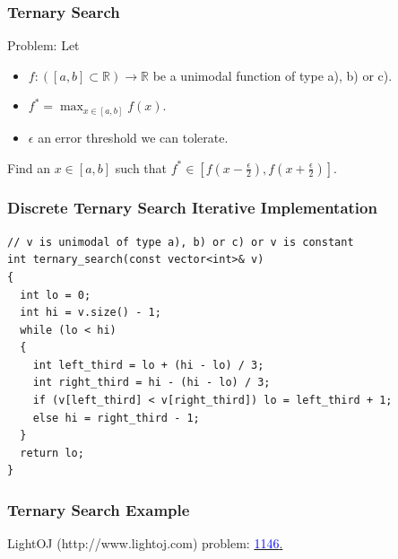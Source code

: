 \documentclass{beamer}
\newcommand{\lightojlink}[2]{LightOJ (http://www.lightoj.com)
  problem: \href{#2}{\textcolor{blue}{#1}.}}
\begin{document}
\begin{frame}%
\frametitle{Ternary Search}


\footnotesize

\begin{mdframed}[style=exampledefault]
Problem: Let
\begin{itemize}
\item $f: ([a,b] \subset \mathbb{R}) \rightarrow \mathbb{R}$ be a unimodal function of type a), b) or c).
\item $f^* = \max_{x \in [a,b]} f(x)$.
\item $\epsilon$ an error threshold we can tolerate.
\end{itemize}
Find an $x \in [a,b]$ such that
$f^* \in [f(x - \frac{\epsilon}{2}), f(x + \frac{\epsilon}{2})]$.
\end{mdframed}


\end{frame}

\begin{frame}[containsverbatim]
\frametitle{Discrete Ternary Search Iterative Implementation}
\scriptsize

\begin{lstlisting}[mathescape]
// v is unimodal of type a), b) or c) or v is constant
int ternary_search(const vector<int>& v)
{
  int lo = 0;
  int hi = v.size() - 1;
  while (lo < hi)
  {
    int left_third = lo + (hi - lo) / 3;
    int right_third = hi - (hi - lo) / 3;
    if (v[left_third] < v[right_third]) lo = left_third + 1;
    else hi = right_third - 1;
  }
  return lo;
}
\end{lstlisting}

\end{frame}

\begin{frame}%
\frametitle{Ternary Search Example}

\lightojlink{1146}{http://www.lightoj.com/volume_showproblem.php?problem=1146}

\end{frame}
\end{document}

